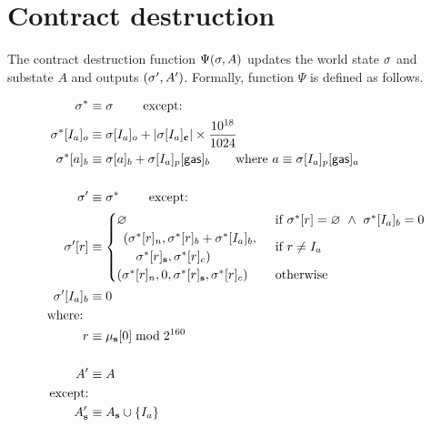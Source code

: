 \documentclass[fleqn,10pt]{SelfArx} %
\begin{document}
\newpage

\section{Contract destruction}\label{sec:contract_destruct}

The contract destruction function $\Psi(\mathbf{\sigma},A)$ updates the world state $\mathbf{\sigma}$ and substate $A$ and outputs $(\mathbf{\sigma}',A')$. Formally, function $\Psi$ is defined as follows.

\begin{align}
	\st^*  &\eqdef \st \qquad \mbox{ except:}\\
		\st^*[I_a]_o &\eqdef \st[I_a]_o + \left|\st[I_a]_{\bf c}\right|\times \collateralperbyte \\
		\st^*[a]_b&\eqdef\st[a]_b+\st[I_a]_p[{\sf gas}]_b
		\qquad\text{where $a  \eqdef \st[I_a]_p[{\sf gas}]_a$}\\ 
	\notag \\ 
	\st'  &\eqdef \st^* \qquad \mbox{ except:}\\
	\st'[r] &\equiv \begin{cases}
		\varnothing &\text{if}\ \st^*[r] = \varnothing\ \wedge\ \st^*[I_{a}]_{b} = 0\\
		\begin{array}{l}
			(\st^*[r]_{n}, \st^*[r]_{b} + \st^*[I_{a}]_{b}, \\
			\quad\st^*[r]_{\mathbf{s}}, \st^*[r]_{c})
		\end{array} & \text{if}\ r \neq I_{a}\\
		(\st^*[r]_{n}, 0, \st^*[r]_{\mathbf{s}}, \st^*[r]_{c}) & \text{otherwise}
	\end{cases}\\
	\st'[I_{a}]_{b} &\eqdef 0 \\
		\mbox{where: } &\\ 
		 r &\eqdef \mst_{\mathbf{s}}[0] \bmod 2^{160} \\
	\notag \\
	A' & \eqdef A \\
	\mbox{except:} & \\ 
	A'_{\mathbf{s}} &\eqdef A_{\mathbf{s}} \cup \{I_a\}
\end{align}



\newpage


\newpage


\end{document}
